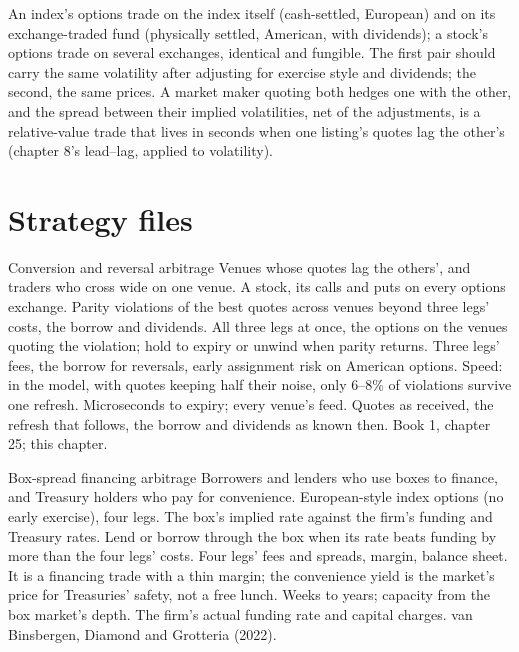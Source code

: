An index's options trade on the index itself (cash-settled, European) and on its exchange-traded fund (physically settled, American, with
dividends); a stock's options trade on several exchanges, identical and fungible. The first pair should carry the same volatility after adjusting
for exercise style and dividends; the second, the same prices. A market maker quoting both hedges one with the other, and the spread between their
implied volatilities, net of the adjustments, is a relative-value trade that lives in seconds when one listing's quotes lag the other's
(chapter 8's lead--lag, applied to volatility).

\section{Strategy files}

\begin{strategyfile}{Conversion and reversal arbitrage}\label{strat:hf:options-cross-venue-and-volatility-arbitrage-at-speed:conversion}
 Venues whose quotes lag the others', and traders who cross wide on one venue.
 A stock, its calls and puts on every options exchange.
 Parity violations of the best quotes across venues beyond three legs' costs, the borrow and dividends.
 All three legs at once, the options on the venues quoting the violation; hold to expiry or unwind when parity returns.
 Three legs' fees, the borrow for reversals, early assignment risk on American options.
 Speed: in the model, with quotes keeping half their noise, only 6--8\% of violations survive one refresh.
 Microseconds to expiry; every venue's feed.
 Quotes as received, the refresh that follows, the borrow and dividends as known then.
 Book 1, chapter 25; this chapter.
\end{strategyfile}

\begin{strategyfile}{Box-spread financing arbitrage}\label{strat:hf:options-cross-venue-and-volatility-arbitrage-at-speed:box}
 Borrowers and lenders who use boxes to finance, and Treasury holders who pay for convenience.
 European-style index options (no early exercise), four legs.
 The box's implied rate against the firm's funding and Treasury rates.
 Lend or borrow through the box when its rate beats funding by more than the four legs' costs.
 Four legs' fees and spreads, margin, balance sheet.
 It is a financing trade with a thin margin; the convenience yield is the market's price for Treasuries' safety, not a free
lunch.
 Weeks to years; capacity from the box market's depth.
 The firm's actual funding rate and capital charges.
 van Binsbergen, Diamond and Grotteria (2022).
\end{strategyfile}

